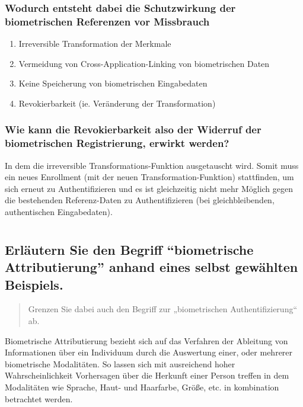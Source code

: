 \documentclass{article}
\newcommand{\annotation}[1]{
    \begin{quote}
    	\begin{textit}{#1}\end{textit}
    \end{quote}
}
\begin{document}
\subsubsection{Wodurch entsteht dabei die Schutzwirkung der biometrischen Referenzen vor Missbrauch}

\begin{enumerate}
    \item Irreversible Transformation der Merkmale
    \item Vermeidung von Cross-Application-Linking von biometrischen Daten
    \item Keine Speicherung von biometrischen Eingabedaten
    \item Revokierbarkeit (ie. Veränderung der Transformation)
\end{enumerate}

\subsubsection{Wie kann die Revokierbarkeit also der Widerruf der biometrischen Registrierung, erwirkt
werden?}

In dem die irreversible Transformations-Funktion ausgetauscht wird. Somit muss ein neues Enrollment
(mit der neuen Transformation-Funktion) stattfinden, um sich erneut zu Authentifizieren und es ist gleichzeitig nicht mehr Möglich
gegen die bestehenden Referenz-Daten zu Authentifizieren (bei gleichbleibenden, authentischen Eingabedaten).

\section{}

\subsection{Erläutern Sie den Begriff ``biometrische Attributierung'' anhand eines selbst gewählten Beispiels.}

\annotation{Grenzen Sie dabei auch den Begriff zur „biometrischen Authentifizierung“ ab.}

Biometrische Attributierung bezieht sich auf das Verfahren der Ableitung von Informationen über ein Individuum durch 
die Auswertung einer, oder mehrerer biometrische Modalitäten. So lassen sich mit ausreichend hoher Wahrscheinlichkeit
Vorhersagen über die Herkunft einer Person treffen in dem Modalitäten wie Sprache, Haut- und Haarfarbe, Größe, etc. in 
kombination betrachtet werden.
\end{document}

